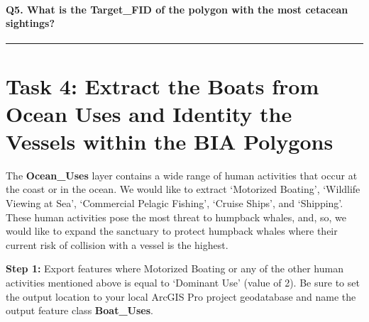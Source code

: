 \documentclass[
]{book}
\begin{document}
\hypertarget{q5.-what-is-the-target_fid-of-the-polygon-with-the-most-cetacean-sightings}{%
\paragraph*{Q5. What is the Target\_FID of the polygon with the most cetacean sightings?}\label{q5.-what-is-the-target_fid-of-the-polygon-with-the-most-cetacean-sightings}}

\begin{center}\rule{0.5\linewidth}{0.5pt}\end{center}

\hypertarget{task-4-extract-the-boats-from-ocean-uses-and-identity-the-vessels-within-the-bia-polygons}{%
\section*{Task 4: Extract the Boats from Ocean Uses and Identity the Vessels within the BIA Polygons}\label{task-4-extract-the-boats-from-ocean-uses-and-identity-the-vessels-within-the-bia-polygons}}

The \textbf{Ocean\_Uses} layer contains a wide range of human activities that occur at the coast or in the ocean. We would like to extract `Motorized Boating', `Wildlife Viewing at Sea', `Commercial Pelagic Fishing', `Cruise Ships', and `Shipping'. These human activities pose the most threat to humpback whales, and, so, we would like to expand the sanctuary to protect humpback whales where their current risk of collision with a vessel is the highest.

\textbf{Step 1:} Export features where Motorized Boating or any of the other human activities mentioned above is equal to `Dominant Use' (value of 2). Be sure to set the output location to your local ArcGIS Pro project geodatabase and name the output feature class \textbf{Boat\_Uses}.
\end{document}
